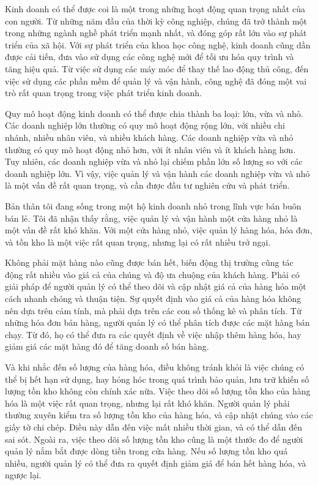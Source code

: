 \documentclass[../DoAn.tex]{subfiles}
\begin{document}
Kinh doanh có thể được coi là một trong những hoạt động quan trọng nhất của con người. Từ những năm đầu của thời kỳ công nghiệp, chúng đã trở thành một trong những ngành nghề phát triển mạnh nhất, và đóng góp rất lớn vào sự phát triển của xã hội. Với sự phát triển của khoa học công nghệ, kinh doanh cũng dần được cải tiến, đưa vào sử dụng các công nghệ mới để tối ưu hóa quy trình và tăng hiệu quả. Từ việc sử dụng các máy móc để thay thế lao động thủ công, đến việc sử dụng các phần mềm để quản lý và vận hành, công nghệ đã đóng một vai trò rất quan trọng trong việc phát triển kinh doanh.

Quy mô hoạt động kinh doanh có thể được chia thành ba loại: lớn, vừa và nhỏ. Các doanh nghiệp lớn thường có quy mô hoạt động rộng lớn, với nhiều chi nhánh, nhiều nhân viên, và nhiều khách hàng. Các doanh nghiệp vừa và nhỏ thường có quy mô hoạt động nhỏ hơn, với ít nhân viên và ít khách hàng hơn. Tuy nhiên, các doanh nghiệp vừa và nhỏ lại chiếm phần lớn số lượng so với các doanh nghiệp lớn. Vì vậy, việc quản lý và vận hành các doanh nghiệp vừa và nhỏ là một vấn đề rất quan trọng, và cần được đầu tư nghiên cứu và phát triển.

Bản thân tôi đang sống trong một hộ kinh doanh nhỏ trong lĩnh vực bán buôn bán lẻ. Tôi đã nhận thấy rằng, việc quản lý và vận hành một cửa hàng nhỏ là một vấn đề rất khó khăn. Với một cửa hàng nhỏ, việc quản lý hàng hóa, hóa đơn, và tồn kho là một việc rất quan trọng, nhưng lại có rất nhiều trở ngại.

Không phải mặt hàng nào cũng được bán hết, biến động thị trường cũng tác động rất nhiều vào giá cả của chúng và độ ưa chuộng của khách hàng. Phải có giải pháp để người quản lý có thể theo dõi và cập nhật giá cả của hàng hóa một cách nhanh chóng và thuận tiện. Sự quyết định vào giá cả của hàng hóa không nên dựa trên cảm tính, mà phải dựa trên các con số thống kê và phân tích. Từ những hóa đơn bán hàng, người quản lý có thể phân tích được các mặt hàng bán chạy. Từ đó, họ có thể đưa ra các quyết định về việc nhập thêm hàng hóa, hay giảm giá các mặt hàng đó để tăng doanh số bán hàng.

Và khi nhắc đến số lượng của hàng hóa, điều không tránh khỏi là việc chúng có thể bị hết hạn sử dụng, hay hỏng hóc trong quá trình bảo quản, lưu trữ khiến số lượng tồn kho không còn chính xác nữa. Việc theo dõi số lượng tồn kho của hàng hóa là một việc rất quan trọng, nhưng lại rất khó khăn. Người quản lý phải thường xuyên kiểm tra số lượng tồn kho của hàng hóa, và cập nhật chúng vào các giấy tờ chi chép. Điều này dẫn đến việc mất nhiều thời gian, và có thể dẫn đến sai sót. Ngoài ra, việc theo dõi số lượng tồn kho cũng là một thước đo để người quản lý nắm bắt được dòng tiền trong cửa hàng. Nếu số lượng tồn kho quá nhiều, người quản lý có thể đưa ra quyết định giảm giá để bán hết hàng hóa, và ngược lại.
\end{document}
